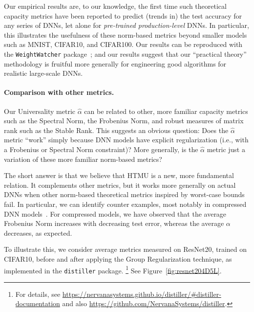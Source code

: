 Our empirical results are, to our knowledge, the first time such theoretical capacity 
metrics have been reported to predict (trends in) the test accuracy for any series of DNNs, let alone for \emph{pre-trained production-level} DNNs.
In particular, this illustrates the usefulness of these norm-based metrics beyond smaller models such as MNIST, CIFAR10, and CIFAR100. 
Our  results can be reproduced with the \texttt{WeightWatcher} package~\cite{weightwatcher_package_justURL}; 
and our
results suggest that our ``practical theory'' methodology is fruitful more generally for engineering good algorithms for realistic large-scale DNNs.

\vspace{-2mm}
\paragraph{Comparison with other metrics.}
Our Universality metric $\hat{\alpha}$ can be related to other, more familiar capacity metrics such as the Spectral Norm, the Frobenius Norm, and robust measures of matrix rank such as the Stable Rank.
This suggests an obvious question: 
Does the $\hat{\alpha}$ metric ``work'' simply because DNN models have explicit regularization (i.e., with a Frobenius or Spectral Norm constraint)?
More generally, is the $\hat{\alpha}$ metric just a variation of these more familiar norm-based metrics?  

The short answer is that we believe that HTMU is a new, more fundamental relation. 
It complements other metrics, but it works more generally on actual DNNs when other norm-based theoretical metrics inspired by worst-case bounds fail. 
In particular, we can identify counter examples, most notably in compressed DNN models~\cite{CWZZ17_TR}.
For compressed models, we have observed that the average Frobenius Norm increases with decreasing test error, whereas the average $\alpha$ decreases, as expected.  


To illustrate this, we consider average metrics measured on ResNet20, trained on CIFAR10, before and after applying the Group Regularization technique, 
as implemented in the \texttt{distiller} package.%
\footnote{For details, see \url{https://nervanasystems.github.io/distiller/\#distiller-documentation} and also \url{https://github.com/NervanaSystems/distiller}.}
See Figure~\ref{fig:resnet204D5L}.

